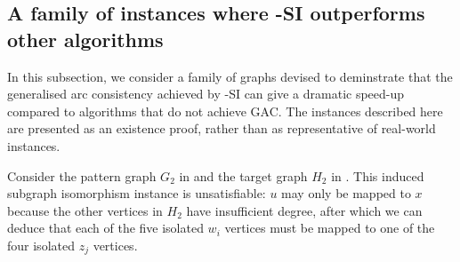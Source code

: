 \subsection{A family of instances where \McSplit-SI outperforms other algorithms}

In this subsection, we consider a family of graphs devised to deminstrate
that the generalised arc consistency achieved by \McSplit-SI can give a dramatic
speed-up compared to algorithms that do not achieve GAC.
The instances described here are presented as an existence proof, rather than
as representative of real-world instances.

Consider the pattern graph $G_2$ in  and the target
graph $H_2$ in .  This induced subgraph isomorphism
instance is unsatisfiable: $u$ may only be mapped to $x$ because the other
vertices in $H_2$ have insufficient degree, after which we can deduce
that each of the five isolated $w_i$ vertices must be mapped to one of the four
isolated $z_j$ vertices.

